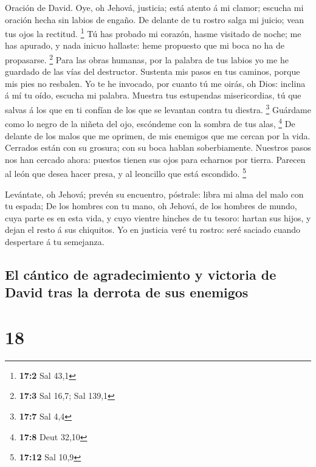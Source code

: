  Oración de David. Oye, oh Jehová, justicia; está atento á
mi clamor; escucha mi oración hecha sin labios de engaño. 
De delante de tu rostro salga mi juicio; vean tus ojos la rectitud.
\footnote{\textbf{17:2} Sal 43,1}  Tú has probado mi
corazón, hasme visitado de noche; me has apurado, y nada inicuo
hallaste: heme propuesto que mi boca no ha de propasarse. \footnote{\textbf{17:3}
  Sal 16,7; Sal 139,1}  Para las obras humanas, por la
palabra de tus labios yo me he guardado de las vías del destructor.
 Sustenta mis pasos en tus caminos, porque mis pies no
resbalen.  Yo te he invocado, por cuanto tú me oirás, oh
Dios: inclina á mí tu oído, escucha mi palabra.  Muestra tus
estupendas misericordias, tú que salvas á los que en ti confían de los
que se levantan contra tu diestra. \footnote{\textbf{17:7} Sal 4,4}
 Guárdame como lo negro de la niñeta del ojo, escóndeme con
la sombra de tus alas, \footnote{\textbf{17:8} Deut 32,10} 
De delante de los malos que me oprimen, de mis enemigos que me cercan
por la vida.  Cerrados están con su grosura; con su boca
hablan soberbiamente.  Nuestros pasos nos han cercado
ahora: puestos tienen sus ojos para echarnos por tierra. 
Parecen al león que desea hacer presa, y al leoncillo que está
escondido. \footnote{\textbf{17:12} Sal 10,9}

 Levántate, oh Jehová; prevén su encuentro, póstrale: libra
mi alma del malo con tu espada;  De los hombres con tu
mano, oh Jehová, de los hombres de mundo, cuya parte es en esta vida, y
cuyo vientre hinches de tu tesoro: hartan sus hijos, y dejan el resto á
sus chiquitos.  Yo en justicia veré tu rostro: seré saciado
cuando despertare á tu semejanza.

\hypertarget{el-cuxe1ntico-de-agradecimiento-y-victoria-de-david-tras-la-derrota-de-sus-enemigos}{%
\subsection{El cántico de agradecimiento y victoria de David tras la
derrota de sus
enemigos}\label{el-cuxe1ntico-de-agradecimiento-y-victoria-de-david-tras-la-derrota-de-sus-enemigos}}

\hypertarget{section-17}{%
\section{18}\label{section-17}}

